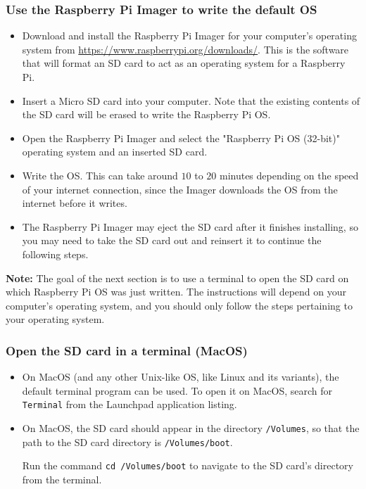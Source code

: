 \documentclass{article}
\begin{document}
\subsubsection{Use the Raspberry Pi Imager to write the default OS}
\begin{itemize}
    \item Download and install the Raspberry Pi Imager for your computer's operating system from \url{https://www.raspberrypi.org/downloads/}. This is the software that will format an SD card to act as an operating system for a Raspberry Pi.
    
    \item Insert a Micro SD card into your computer. Note that the existing contents of the SD card will be erased to write the Raspberry Pi OS.
    
    \item Open the Raspberry Pi Imager and select the "Raspberry Pi OS (32-bit)" operating system and an inserted SD card.
    
    \item Write the OS. This can take around $10$ to $20$ minutes depending on the speed of your internet connection, since the Imager downloads the OS from the internet before it writes.

    \item The Raspberry Pi Imager may eject the SD card after it finishes installing, so you may need to take the SD card out and reinsert it to continue the following steps.
\end{itemize}

\textbf{Note:} The goal of the next section is to use a terminal to open the SD card on which Raspberry Pi OS was just written. The instructions will depend on your computer's operating system, and you should only follow the steps pertaining to your operating system. 

\subsubsection{Open the SD card in a terminal (MacOS)}
\begin{itemize}
    \item On MacOS (and any other Unix-like OS, like Linux and its variants), the default terminal program can be used. To open it on MacOS, search for \texttt{Terminal} from the Launchpad application listing. 
    
    \item On MacOS, the SD card should appear in the directory \texttt{/Volumes}, so that the path to the SD card directory is \texttt{/Volumes/boot}.
    
    Run the command \texttt{cd /Volumes/boot} to navigate to the SD card's directory from the terminal.
\end{itemize}
\end{document}
